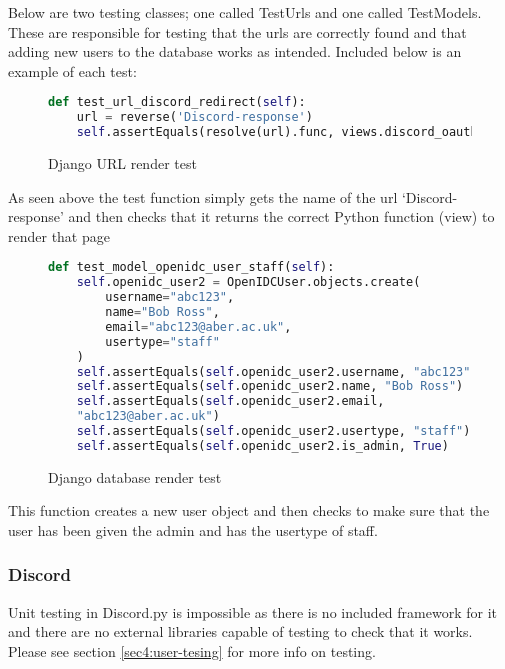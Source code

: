 Below are two testing classes; one called TestUrls and one called TestModels. These are responsible for testing that the urls are correctly found and that adding new users to the database works as intended. Included below is an example of each test:

\begin{figure}[H]
\begin{lstlisting}[language=Python]
def test_url_discord_redirect(self):
    url = reverse('Discord-response')
    self.assertEquals(resolve(url).func, views.discord_oauth2_redirect)
\end{lstlisting}
\caption{Django URL render test}
\label{fig:django-url}
\end{figure}
As seen above the test function simply gets the name of the url `Discord-response' and then checks that it returns the correct Python function (view) to render that page

\begin{figure}[H]
\begin{lstlisting}[language=Python]
def test_model_openidc_user_staff(self):
    self.openidc_user2 = OpenIDCUser.objects.create(
        username="abc123",
        name="Bob Ross",
        email="abc123@aber.ac.uk",
        usertype="staff"
    )
    self.assertEquals(self.openidc_user2.username, "abc123")
    self.assertEquals(self.openidc_user2.name, "Bob Ross")
    self.assertEquals(self.openidc_user2.email, 
    "abc123@aber.ac.uk")
    self.assertEquals(self.openidc_user2.usertype, "staff")
    self.assertEquals(self.openidc_user2.is_admin, True)
\end{lstlisting}
\caption{Django database render test}
\label{fig:django-database}
\end{figure}
This function creates a new user object and then checks to make sure that the user has been given the admin and has the usertype of staff.

\subsubsection{Discord}
Unit testing in Discord.py is impossible as there is no included framework for it and there are no external libraries capable of testing to check that it works. Please see section \ref{sec4:user-tesing} for more info on testing.


